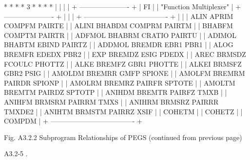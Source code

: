 \newpage {}
\begin{center}
\begin{boxedverbatim}
                               *
                              * *
                             * 3 *
                              * *
                               *
                               |
                               |
                               |
                               |
                  + ---------------------- +
                  |           FI           |
                  | "Function Multiplexer" |
                  + ---------------------- +
                               |
                               |
                               |
           + ------------------------------------- +
           |                                       |
           |   ALIN     APRIM    COMPFM   PAIRTE   |
           |   ALINI    BHABDM   COMPRM   PAIRTM   |
           |            BHABFM   COMPTM   PAIRTR   |
           |   ADFMOL   BHABRM   CRATIO   PAIRTU   |
           |   ADIMOL   BHABTM   EBIND    PAIRTZ   |
           |   ADDMOL   BREMDR   EBR1     PBR1     |
           |   ALOG     BREMFR   EDEDX    PBR2     |
           |   EXP      BREMDZ   ESIG     PDEDX    |
           |   AREC     BRMSDZ   FCOULC   PHOTTZ   |
           |   ALKE     BREMFZ   GBR1     PHOTTE   |
           |   ALKEI    BRMSFZ   GBR2     PSIG     |
           |   AMOLDM   BREMRR   GMFP     SPIONE   |
           |   AMOLFM   BREMRM   PAIRDR   SPIONP   |
           |   AMOLRM   BREMRZ   PAIRFR   SPTOTE   |
           |   AMOLTM   BREMTM   PAIRDZ   SPTOTP   |
           |   ANIHDM   BREMTR   PAIRFZ   TMXB     |
           |   ANIHFM   BRMSRM   PAIRRM   TMXS     |
           |   ANIHRM   BRMSRZ   PAIRRR   TMXDE2   |
           |   ANIHTM   BRMSTM   PAIRRZ   XSIF     |
           |            COHETM                     |
           |            COHETZ                     |
           |            COMPDM                     |
           + ------------------------------------- +

      Fig. A3.2.2  Subprogram Relationships of PEGS
                   (continued from previous page)


 A3.2-5                                                       .
\end{boxedverbatim}
\end{center}
